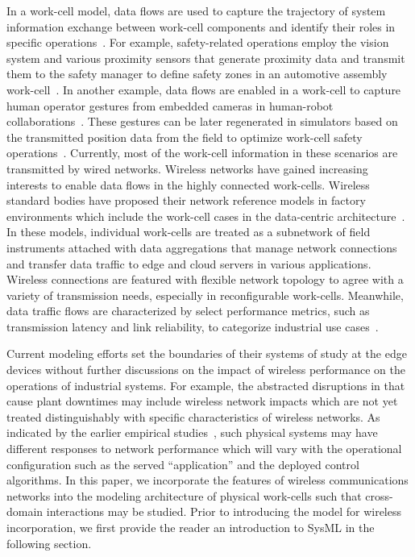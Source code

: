 In a work-cell model, data flows are used to capture the trajectory of system information exchange between work-cell components and identify their roles in specific operations~\cite{OpenArch}. For example, safety-related operations employ the vision system and various proximity sensors that generate proximity data and transmit them to the safety manager to define safety zones in an automotive assembly work-cell~\cite{safeeye}. 
In another example, data flows are enabled in a work-cell to capture human operator gestures from embedded cameras in human-robot collaborations~\cite{cobotcell}. These gestures can be later regenerated in simulators based on the transmitted position data from the field to optimize work-cell safety operations~\cite{gesture}. Currently, most of the work-cell information in these scenarios are transmitted by wired networks. Wireless networks have gained increasing interests to enable data flows in the highly connected work-cells. Wireless standard bodies have proposed their network reference models in factory environments which include the work-cell cases in the data-centric architecture~\cite{ETSI889, KPItable}. In these models, individual work-cells are treated as a subnetwork of field instruments attached with data aggregations that manage network connections and transfer data traffic to edge and cloud servers in various applications. Wireless connections are featured with flexible network topology to agree with a variety of transmission needs, especially in reconfigurable work-cells. Meanwhile, data traffic flows are characterized by select performance metrics, such as transmission latency and link reliability, to categorize industrial use cases~\cite{KPItable}. 

Current modeling efforts set the boundaries of their systems of study at the edge devices without further discussions on the impact of wireless performance on the operations of industrial systems. For example, the abstracted disruptions in \cite{QChang,Liu2012} that cause plant downtimes may include wireless network impacts which are not yet treated distinguishably with specific characteristics of wireless networks. As indicated by the earlier empirical studies~\cite{LIU2017412}, such physical systems may have different responses to network performance which will vary with the operational configuration such as the served ``application'' and the deployed control algorithms. In this paper, we incorporate the features of wireless communications networks into the modeling architecture of physical work-cells such that cross-domain interactions may be studied.  Prior to introducing the model for wireless incorporation, we first provide the reader an introduction to SysML in the following section.

